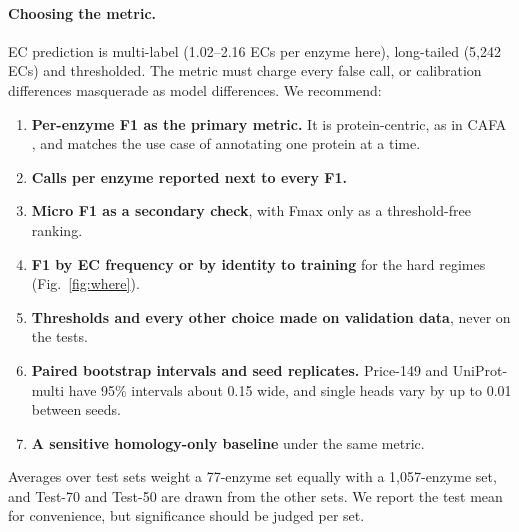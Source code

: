 \documentclass[11pt]{article}
\begin{document}
\paragraph{Choosing the metric.}
EC prediction is multi-label (1.02--2.16 ECs per enzyme here), long-tailed (5,242 ECs) and thresholded. The metric
must charge every false call, or calibration differences masquerade as model differences. We recommend:
\begin{enumerate}
  \item \textbf{Per-enzyme F1 as the primary metric.} It is protein-centric, as in CAFA \cite{radivojac2013,zhou2019cafa},
        and matches the use case of annotating one protein at a time.
  \item \textbf{Calls per enzyme reported next to every F1.}
  \item \textbf{Micro F1 as a secondary check}, with Fmax only as a threshold-free ranking.
  \item \textbf{F1 by EC frequency or by identity to training} for the hard regimes (Fig.~\ref{fig:where}).
  \item \textbf{Thresholds and every other choice made on validation data}, never on the tests.
  \item \textbf{Paired bootstrap intervals and seed replicates.} Price-149 and UniProt-multi have 95\% intervals about
        0.15 wide, and single heads vary by up to 0.01 between seeds.
  \item \textbf{A sensitive homology-only baseline} under the same metric.
\end{enumerate}
Averages over test sets weight a 77-enzyme set equally with a 1,057-enzyme set, and Test-70 and Test-50 are drawn from
the other sets. We report the test mean for convenience, but significance should be judged per set.
\end{document}
